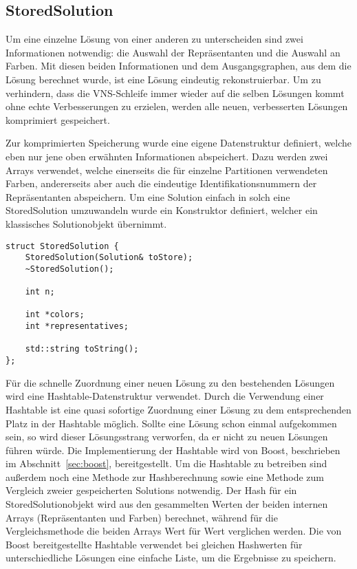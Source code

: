 \subsection{StoredSolution}
Um eine einzelne Lösung von einer anderen zu unterscheiden sind zwei Informationen notwendig: die Auswahl der Repräsentanten und die Auswahl 
an Farben. Mit diesen beiden Informationen und dem Ausgangsgraphen, aus dem die Lösung berechnet wurde, ist eine Lösung eindeutig rekonstruierbar.
Um zu verhindern, dass die VNS-Schleife immer wieder auf die selben Lösungen kommt ohne echte Verbesserungen zu erzielen, werden alle neuen, verbesserten
Lösungen komprimiert gespeichert. 

Zur komprimierten Speicherung wurde eine eigene Datenstruktur definiert, welche eben nur jene oben erwähnten Informationen abspeichert. 
Dazu werden zwei Arrays verwendet, welche einerseits die für einzelne Partitionen verwendeten Farben, andererseits aber auch die 
eindeutige Identifikationsnummern der Repräsentanten abspeichern. Um eine Solution einfach in solch eine StoredSolution umzuwandeln wurde
ein Konstruktor definiert, welcher ein klassisches Solutionobjekt übernimmt. 

\singlespacing
\begin{lstlisting}[caption={Die Signatur von StoredSolution},label={lst:stored}]
struct StoredSolution {
	StoredSolution(Solution& toStore);
	~StoredSolution();

	int n;

	int *colors;
	int *representatives;

	std::string toString();
};
\end{lstlisting}

Für die schnelle Zuordnung einer neuen Lösung zu den bestehenden Lösungen wird eine Hashtable-Datenstruktur verwendet. Durch die Verwendung einer
Hashtable ist eine quasi sofortige Zuordnung einer Lösung zu dem entsprechenden Platz in der Hashtable möglich. Sollte eine Lösung schon einmal 
aufgekommen sein, so wird dieser Lösungsstrang verworfen, da er nicht zu neuen Lösungen führen würde. Die Implementierung der Hashtable wird von 
Boost, beschrieben im Abschnitt~\ref{sec:boost}, bereitgestellt. Um die Hashtable zu betreiben sind außerdem noch eine Methode zur Hashberechnung
sowie eine Methode zum Vergleich zweier gespeicherten Solutions notwendig. Der Hash für ein StoredSolutionobjekt wird aus den gesammelten Werten
der beiden internen Arrays (Repräsentanten und Farben) berechnet, während für die Vergleichsmethode die beiden Arrays Wert für Wert verglichen werden. Die von Boost 
bereitgestellte Hashtable verwendet bei gleichen Hashwerten für unterschiedliche Lösungen eine einfache Liste, um die Ergebnisse zu speichern.

